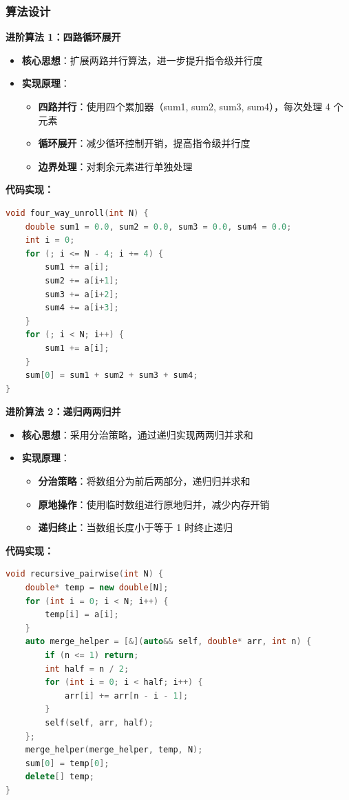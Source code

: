 ﻿\documentclass[9pt,a4paper]{article}
\begin{document}
\subsubsection{算法设计}
\textbf{进阶算法 1：四路循环展开}
\begin{itemize}
    \item \textbf{核心思想}：扩展两路并行算法，进一步提升指令级并行度
    \item \textbf{实现原理}：
    \begin{itemize}
        \item \textbf{四路并行}：使用四个累加器（sum1, sum2, sum3, sum4），每次处理 4 个元素
        \item \textbf{循环展开}：减少循环控制开销，提高指令级并行度
        \item \textbf{边界处理}：对剩余元素进行单独处理
    \end{itemize}
\end{itemize}
\textbf{代码实现：}
\begin{lstlisting}[language=C++]
void four_way_unroll(int N) {
    double sum1 = 0.0, sum2 = 0.0, sum3 = 0.0, sum4 = 0.0;
    int i = 0;
    for (; i <= N - 4; i += 4) {
        sum1 += a[i];
        sum2 += a[i+1];
        sum3 += a[i+2];
        sum4 += a[i+3];
    }
    for (; i < N; i++) {
        sum1 += a[i];
    }
    sum[0] = sum1 + sum2 + sum3 + sum4;
}
\end{lstlisting}


\textbf{进阶算法 2：递归两两归并}
\begin{itemize}
    \item \textbf{核心思想}：采用分治策略，通过递归实现两两归并求和
    \item \textbf{实现原理}：
    \begin{itemize}
        \item \textbf{分治策略}：将数组分为前后两部分，递归归并求和
        \item \textbf{原地操作}：使用临时数组进行原地归并，减少内存开销
        \item \textbf{递归终止}：当数组长度小于等于 1 时终止递归
    \end{itemize}
\end{itemize}


\textbf{代码实现：}
\begin{lstlisting}[language=C++]
void recursive_pairwise(int N) {
    double* temp = new double[N];
    for (int i = 0; i < N; i++) {
        temp[i] = a[i];
    }
    auto merge_helper = [&](auto&& self, double* arr, int n) {
        if (n <= 1) return;
        int half = n / 2;
        for (int i = 0; i < half; i++) {
            arr[i] += arr[n - i - 1];
        }
        self(self, arr, half);
    };
    merge_helper(merge_helper, temp, N);
    sum[0] = temp[0];
    delete[] temp;
}
\end{lstlisting}
\end{document}
